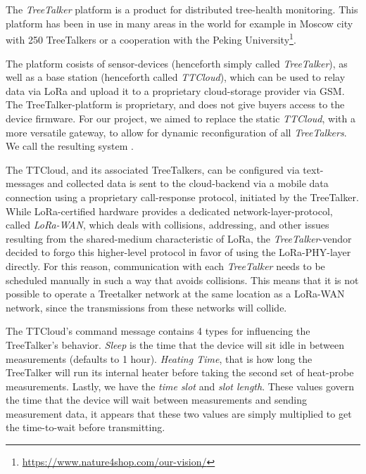 \section{\ttt}
\label{sec:treetalker}

The \emph{TreeTalker} platform is a product for distributed tree-health monitoring.
This platform has been in use in many areas in the world for example in Moscow city with 250 TreeTalkers or a cooperation with the Peking University\footnote{\url{https://www.nature4shop.com/our-vision/}}.

The platform cosists of sensor-devices (henceforth simply called \textit{TreeTalker}), as well as a base station (henceforth called \textit{TTCloud}), which can be used to relay data via LoRa and upload it to a proprietary cloud-storage provider via GSM.
The TreeTalker-platform is proprietary, and does not give buyers access to the device firmware.
For our project, we aimed to replace the static \textit{TTCloud}, with a more versatile gateway, to allow for dynamic reconfiguration of all \textit{TreeTalkers}.
We call the resulting system \ttt.

The TTCloud, and its associated TreeTalkers, can be configured via text-messages and collected data is sent to the cloud-backend via a mobile data connection using a proprietary call-response protocol, initiated by the TreeTalker.
While LoRa-certified hardware provides a dedicated network-layer-protocol, called \textit{LoRa-WAN}, which deals with collisions, addressing, and other issues resulting from the shared-medium characteristic of LoRa, the \textit{TreeTalker}-vendor decided to forgo this higher-level protocol in favor of using the LoRa-PHY-layer directly.
For this reason, communication with each \textit{TreeTalker} needs to be scheduled manually in such a way that avoids collisions.
This means that it is not possible to operate a Treetalker network at the same location as a LoRa-WAN network, since the transmissions from these networks will collide.


The TTCloud's command message contains 4 types for influencing the TreeTalker's behavior.
\textit{Sleep} is the time that the device will sit idle in between measurements (defaults to 1 hour).
\textit{Heating Time}, that is how long the TreeTalker will run its internal heater before taking the second set of heat-probe measurements.
Lastly, we have the \textit{time slot} and \textit{slot length}.
These values govern the time that the device will wait between measurements and sending measurement data, it appears that these two values are simply multiplied to get the time-to-wait before transmitting.

